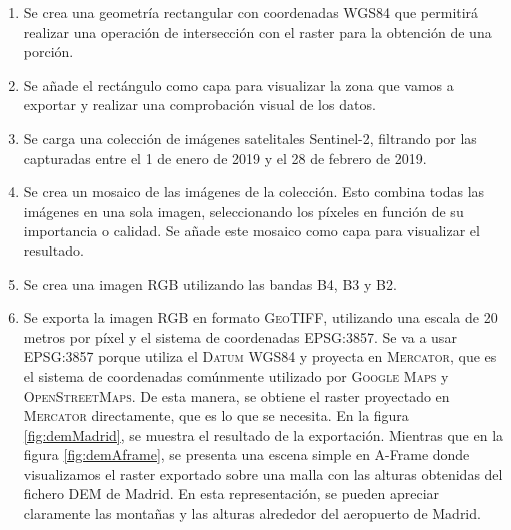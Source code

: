 \documentclass[a4paper, 11pt]{book}
\begin{document}
\begin{enumerate}
    \item Se crea una geometría rectangular con coordenadas \textsc{WGS84} que  permitirá realizar una operación de intersección con el raster para la obtención de una porción.
    \item Se añade el rectángulo como capa para visualizar la zona que vamos a exportar y realizar una comprobación visual de los datos.
    \item Se carga una colección de imágenes satelitales Sentinel-2, filtrando por las capturadas entre el 1 de enero de 2019 y el 28 de febrero de 2019.
    \item Se crea un mosaico de las imágenes de la colección. Esto combina todas las imágenes en una sola imagen, seleccionando los píxeles en función de su importancia o calidad. Se añade este mosaico como capa para visualizar el resultado.
    \item Se crea una imagen \textsc{RGB} utilizando las bandas B4, B3 y B2.
    \item Se exporta la imagen \textsc{RGB} en formato \textsc{GeoTIFF}, utilizando una escala de 20 metros por píxel y el sistema de coordenadas \textsc{EPSG:3857}. Se va a usar \textsc{EPSG:3857} porque utiliza el \textsc{Datum WGS84} y proyecta en \textsc{Mercator}, que es el sistema de coordenadas comúnmente utilizado por \textsc{Google Maps} y \textsc{OpenStreetMaps}. De esta manera, se obtiene el raster proyectado en \textsc{Mercator} directamente, que es lo que se necesita.
    En la figura \ref{fig:demMadrid}, se muestra el resultado de la exportación. Mientras que en la figura \ref{fig:demAframe}, se presenta una escena simple en A-Frame donde visualizamos el raster exportado sobre una malla con las alturas obtenidas del fichero DEM de Madrid. En esta representación, se pueden apreciar claramente las montañas y las alturas alrededor del aeropuerto de Madrid.
\end{enumerate}
\label{manual:generacionRaster}
\end{document}
